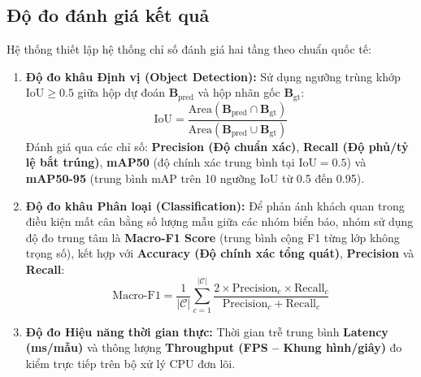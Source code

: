 \subsection{Độ đo đánh giá kết quả}
\label{subsec:do_do_danh_gia}

Hệ thống thiết lập hệ thống chỉ số đánh giá hai tầng theo chuẩn quốc tế:

\begin{enumerate}
    \item \textbf{Độ đo khâu Định vị (Object Detection):} Sử dụng ngưỡng trùng khớp $\text{IoU} \ge 0.5$ giữa hộp dự đoán $\mathbf{B}_{\text{pred}}$ và hộp nhãn gốc $\mathbf{B}_{\text{gt}}$:
    \begin{equation}
        \text{IoU} = \frac{\text{Area}(\mathbf{B}_{\text{pred}} \cap \mathbf{B}_{\text{gt}})}{\text{Area}(\mathbf{B}_{\text{pred}} \cup \mathbf{B}_{\text{gt}})}
        \label{eq:iou}
    \end{equation}
    Đánh giá qua các chỉ số: \textbf{Precision (Độ chuẩn xác)}, \textbf{Recall (Độ phủ/tỷ lệ bắt trúng)}, \textbf{mAP50} (độ chính xác trung bình tại $\text{IoU} = 0.5$) và \textbf{mAP50-95} (trung bình mAP trên 10 ngưỡng IoU từ 0.5 đến 0.95).

    \item \textbf{Độ đo khâu Phân loại (Classification):} Để phản ánh khách quan trong điều kiện mất cân bằng số lượng mẫu giữa các nhóm biển báo, nhóm sử dụng độ đo trung tâm là \textbf{Macro-F1 Score} (trung bình cộng F1 từng lớp không trọng số), kết hợp với \textbf{Accuracy (Độ chính xác tổng quát)}, \textbf{Precision} và \textbf{Recall}:
    \begin{equation}
        \text{Macro-F1} = \frac{1}{|\mathcal{C}|} \sum_{c=1}^{|\mathcal{C}|} \frac{2 \times \text{Precision}_c \times \text{Recall}_c}{\text{Precision}_c + \text{Recall}_c}
        \label{eq:macro_f1}
    \end{equation}

    \item \textbf{Độ đo Hiệu năng thời gian thực:} Thời gian trễ trung bình \textbf{Latency (ms/mẫu)} và thông lượng \textbf{Throughput (FPS -- Khung hình/giây)} đo kiểm trực tiếp trên bộ xử lý CPU đơn lõi.
\end{enumerate}
